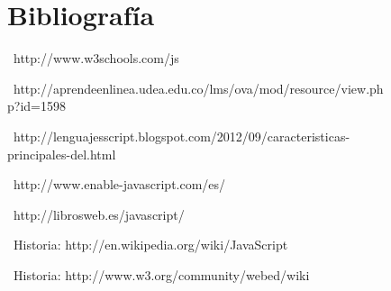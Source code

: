 \documentclass[11pt]{article} %
\begin{document}
\begin{figure}


\section{Bibliografía}


\  {http://www.w3schools.com/js }

\  {http://aprendeenlinea.udea.edu.co/lms/ova/mod/resource/view.php?id=1598 }

\  {http://lenguajesscript.blogspot.com/2012/09/caracteristicas-principales-del.html }

\ {http://www.enable-javascript.com/es/}

\ {http://librosweb.es/javascript/}


\ {Historia: http://en.wikipedia.org/wiki/JavaScript} 

\ {Historia: http://www.w3.org/community/webed/wiki}


\end{figure}
\end{document}
